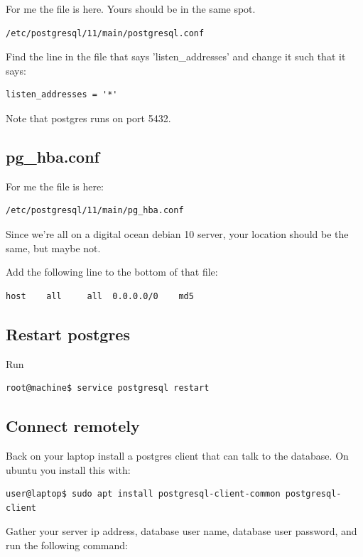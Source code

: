 \documentclass[12pt,a4paper]{article}
\begin{document}
For me the file is here. Yours should be in the same spot.

\begin{verbatim}
/etc/postgresql/11/main/postgresql.conf 
\end{verbatim}

Find the line in the file that says 'listen\_addresses' and change it such that it says:

\begin{verbatim}
listen_addresses = '*'
\end{verbatim}

Note that postgres runs on port 5432.

\subsection{pg\_hba.conf}
 For me the file is here:

\begin{verbatim}
/etc/postgresql/11/main/pg_hba.conf 
\end{verbatim}

Since we're all on a digital ocean debian 10 server, your location should be the same, but maybe not. 

Add the following line to the bottom of that file:

\begin{verbatim}
host    all     all  0.0.0.0/0    md5
\end{verbatim}

\subsection{Restart postgres}
Run
\begin{lstlisting}
root@machine$ service postgresql restart
\end{lstlisting}

\subsection{Connect remotely}

Back on your laptop install a postgres client that can talk to the database. On ubuntu you install this with:

\begin{verbatim}
user@laptop$ sudo apt install postgresql-client-common postgresql-client
\end{verbatim}

Gather your server ip address, database user name, database user password, and run the following command:
\end{document}
